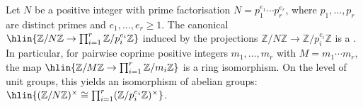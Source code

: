 \begin{theorem} \label{theorem:chinese_remainder_theorem_for_Z}
Let $N$ be a positive integer with prime factorisation $N = p_1^{e_1} \cdots p_r^{e_r}$, where $p_1, \ldots, p_r$ are distinct primes and $e_1, \ldots, e_r \geq 1$.
The canonical 
$\hlin{\mathbb{Z}/N\mathbb{Z} \to \prod_{i=1}^r \mathbb{Z}/p_i^{e_i}\mathbb{Z}}$
induced by the projections $\mathbb{Z}/N\mathbb{Z} \to \mathbb{Z}/p_i^{e_i}\mathbb{Z}$ is a .
In particular, for pairwise coprime positive integers $m_1, \ldots, m_r$ with $M = m_1 \cdots m_r$, the map
$\hlin{\mathbb{Z}/M\mathbb{Z} \to \prod_{i=1}^r \mathbb{Z}/m_i\mathbb{Z}}$
is a ring isomorphism.
On the level of unit groups, this yields an isomorphism of abelian groups:
$\hlin{(\mathbb{Z}/N\mathbb{Z})^\times \cong \prod_{i=1}^r (\mathbb{Z}/p_i^{e_i}\mathbb{Z})^\times}$.
\end{theorem}
